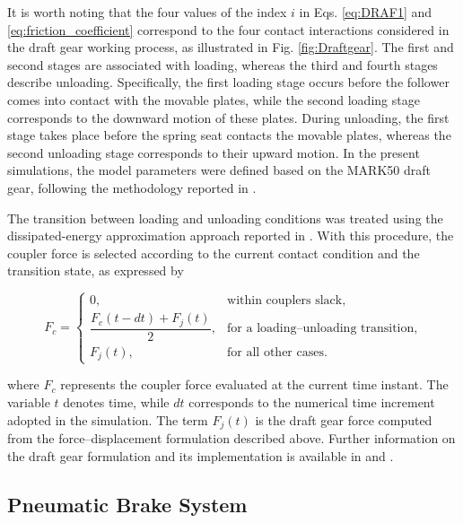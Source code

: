 \documentclass[preprint,10pt]{elsarticle}
\begin{document}
It is worth noting that the four values of the index $i$ in Eqs. \eqref{eq:DRAF1} and \eqref{eq:friction_coefficient} correspond to the four contact interactions considered in the draft gear working process, as illustrated in Fig. \ref{fig:Draftgear}. The first and second stages are associated with loading, whereas the third and fourth stages describe unloading. Specifically, the first loading stage occurs before the follower comes into contact with the movable plates, while the second loading stage corresponds to the downward motion of these plates. During unloading, the first stage takes place before the spring seat contacts the movable plates, whereas the second unloading stage corresponds to their upward motion. In the present simulations, the model parameters were defined based on the MARK50 draft gear, following the methodology reported in \cite{eckert2023fast}.






The transition between loading and unloading conditions was treated using the dissipated-energy approximation approach reported in \cite{eckert2019dissipated,eckert2023fast}. With this procedure, the coupler force is selected according to the current contact condition and the transition state, as expressed by

\begin{equation}
\label{eq:energy}
F_c
=
\begin{cases}
0, & \text{within couplers slack}, \\[2mm]
\dfrac{F_c(t-dt)+F_j(t)}{2}, & \text{for a loading--unloading transition}, \\[3mm]
F_j(t), & \text{for all other cases}.
\end{cases}
\end{equation}

\noindent where $F_c$ represents the coupler force evaluated at the current time instant. The variable $t$ denotes time, while $dt$ corresponds to the numerical time increment adopted in the simulation. The term $F_j(t)$ is the draft gear force computed from the force--displacement formulation described above. Further information on the draft gear formulation and its implementation is available in \cite{wu2017comparisons} and  \cite{eckert2019dissipated,eckert2023fast}.

\subsection{Pneumatic Brake System}\label{Brake}
\end{document}

